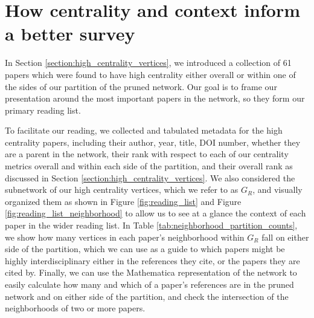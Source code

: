 \documentclass[12pt]{thesis}
\theoremstyle{plain}
\theoremstyle{definition}
\theoremstyle{remark}
\begin{document}
\section{How centrality and context inform a better survey}

In Section \ref{section:high_centrality_vertices}, we introduced a collection of 61 papers which were found to have high centrality either overall or within one of the sides of our partition of the pruned network. Our goal is to frame our presentation around the most important papers in the network, so they form our primary reading list. 

To facilitate our reading, we collected and tabulated metadata for the high centrality papers, including their author, year, title, DOI number, whether they are a parent in the network, their rank with respect to each of our centrality metrics overall and within each side of the partition, and their overall rank as discussed in Section \ref{section:high_centrality_vertices}. We also considered the subnetwork of our high centrality vertices, which we refer to as $G_R$, and visually organized them as shown in Figure \ref{fig:reading_list} and Figure \ref{fig:reading_list_neighborhood} to allow us to see at a glance the context of each paper in the wider reading list. In Table \ref{tab:neighborhood_partition_counts}, we show how many vertices in each paper's neighborhood within $G_R$ fall on either side of the partition, which we can use as a guide to which papers might be highly interdisciplinary either in the references they cite, or the papers they are cited by. Finally, we can use the Mathematica representation of the network to easily calculate how many and which of a paper's references are in the pruned network and on either side of the partition, and check the intersection of the neighborhoods of two or more papers.
\end{document}
